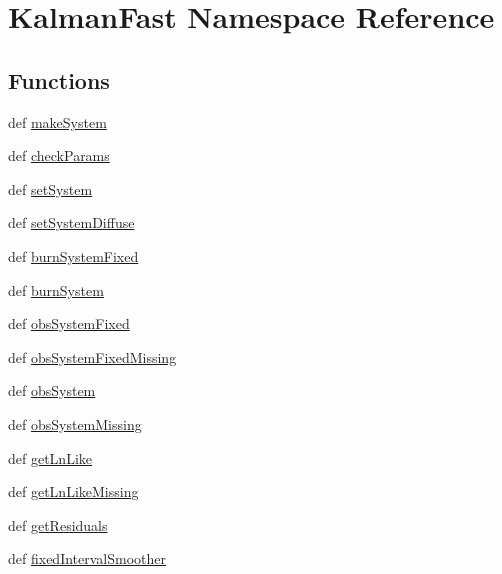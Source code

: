 \hypertarget{namespace_kalman_fast}{\section{Kalman\-Fast Namespace Reference}
\label{namespace_kalman_fast}
}
\subsection*{Functions}
\begin{DoxyCompactItemize}
\item 
def \hyperlink{namespace_kalman_fast_a2e58cd85931f067069622355623d60f7}{make\-System}
\item 
def \hyperlink{namespace_kalman_fast_a93baa236856614fff1114e942663c940}{check\-Params}
\item 
def \hyperlink{namespace_kalman_fast_a599ed523e7fcf7ac22112248d8a31c4d}{set\-System}
\item 
def \hyperlink{namespace_kalman_fast_a308c13060d7fef2e08c668baa4f5c3fb}{set\-System\-Diffuse}
\item 
def \hyperlink{namespace_kalman_fast_aa3688eda0919f31279971be1007f5ceb}{burn\-System\-Fixed}
\item 
def \hyperlink{namespace_kalman_fast_a773a341412a385d39ed10ce68dd87bb0}{burn\-System}
\item 
def \hyperlink{namespace_kalman_fast_a2ca9007cfa54c66b77cabd70e599395e}{obs\-System\-Fixed}
\item 
def \hyperlink{namespace_kalman_fast_ab15297ce7c869d9c749f8ac170fc091e}{obs\-System\-Fixed\-Missing}
\item 
def \hyperlink{namespace_kalman_fast_acf131e0bf3988ca746748906158dc85f}{obs\-System}
\item 
def \hyperlink{namespace_kalman_fast_a742169bce77d3a99ff5806e4bff223ee}{obs\-System\-Missing}
\item 
def \hyperlink{namespace_kalman_fast_aff10a690431ea74c678c101767811865}{get\-Ln\-Like}
\item 
def \hyperlink{namespace_kalman_fast_aa58a01d0dc5d786acd10e70f29572750}{get\-Ln\-Like\-Missing}
\item 
def \hyperlink{namespace_kalman_fast_a9bd7e9be6130240320b671d5b4926a23}{get\-Residuals}
\item 
def \hyperlink{namespace_kalman_fast_a4becb61d8d27132af8940ddf2717f13a}{fixed\-Interval\-Smoother}
\end{DoxyCompactItemize}


